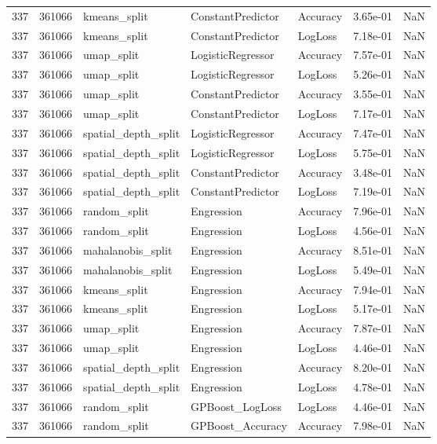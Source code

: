 \begin{tabular}{rrlllrr}
337 & 361066 & kmeans\_split & ConstantPredictor & Accuracy & 3.65e-01 & NaN \\
337 & 361066 & kmeans\_split & ConstantPredictor & LogLoss & 7.18e-01 & NaN \\
337 & 361066 & umap\_split & LogisticRegressor & Accuracy & 7.57e-01 & NaN \\
337 & 361066 & umap\_split & LogisticRegressor & LogLoss & 5.26e-01 & NaN \\
337 & 361066 & umap\_split & ConstantPredictor & Accuracy & 3.55e-01 & NaN \\
337 & 361066 & umap\_split & ConstantPredictor & LogLoss & 7.17e-01 & NaN \\
337 & 361066 & spatial\_depth\_split & LogisticRegressor & Accuracy & 7.47e-01 & NaN \\
337 & 361066 & spatial\_depth\_split & LogisticRegressor & LogLoss & 5.75e-01 & NaN \\
337 & 361066 & spatial\_depth\_split & ConstantPredictor & Accuracy & 3.48e-01 & NaN \\
337 & 361066 & spatial\_depth\_split & ConstantPredictor & LogLoss & 7.19e-01 & NaN \\
337 & 361066 & random\_split & Engression & Accuracy & 7.96e-01 & NaN \\
337 & 361066 & random\_split & Engression & LogLoss & 4.56e-01 & NaN \\
337 & 361066 & mahalanobis\_split & Engression & Accuracy & 8.51e-01 & NaN \\
337 & 361066 & mahalanobis\_split & Engression & LogLoss & 5.49e-01 & NaN \\
337 & 361066 & kmeans\_split & Engression & Accuracy & 7.94e-01 & NaN \\
337 & 361066 & kmeans\_split & Engression & LogLoss & 5.17e-01 & NaN \\
337 & 361066 & umap\_split & Engression & Accuracy & 7.87e-01 & NaN \\
337 & 361066 & umap\_split & Engression & LogLoss & 4.46e-01 & NaN \\
337 & 361066 & spatial\_depth\_split & Engression & Accuracy & 8.20e-01 & NaN \\
337 & 361066 & spatial\_depth\_split & Engression & LogLoss & 4.78e-01 & NaN \\
337 & 361066 & random\_split & GPBoost\_LogLoss & LogLoss & 4.46e-01 & NaN \\
337 & 361066 & random\_split & GPBoost\_Accuracy & Accuracy & 7.98e-01 & NaN \\

\end{tabular}
